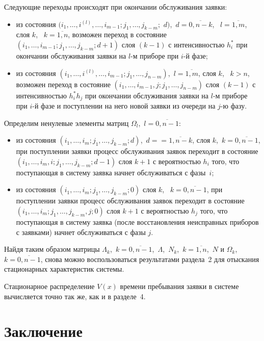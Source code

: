\begin{multicols}{2}
Следующие переходы происходят при окончании обслуживания заявки:
\begin{itemize}
\item
из состояния
$(i_1,\ldots,i^{(l)},\ldots,i_{m-1};j_1,\ldots,j_{k-m};$ $d)$,\
$d=\overline{0,n-k}$, \
$l=\overline{1,m}$,
слоя $k$, \ $k=\overline{1,n}$, возможен переход в состояние
$(i_1,\ldots,i_{m-1};j_1,\ldots,j_{k-m};d+1)$
слоя $(k-1)$ с интенсивностью $h^*_i $ при окончании обслуживания
заявки на $l$-м приборе при $i$-й фазе;
\item
из состояния
$(i_1,\ldots,i^{(l)}\!,\ldots,i_{m-1};j_1,\ldots,j_{n-m})$,\
$l=\overline{1,m}$,
слоя $k$, \ $k>n$, возможен переход в состояние
$(i_1,\ldots,i_{m-1},j;j_1,\ldots,j_{n-m})$
слоя $(k-1)$ с интенсивностью $h^*_i h_j$ при окончании обслуживания
заявки на $l$-м приборе при $i$-й фазе и поступлении на него
новой заявки из очереди на $j$-ю фазу.
\end{itemize}

Определим ненулевые элементы матриц
$\Omega_l$,\  $l=\overline{0,n-1}$:
\begin{itemize}
\item
из состояния
$(i_1,\ldots,i_{m};j_1,\ldots,j_{k-m};d)$,\ $d=$\linebreak $=\overline{1,n-k}$,
слоя $k$,\ $k=\overline{0,n-1}$,
при поступлении заявки процесс обслуживания заявок переходит в состояние
$(i_1,\ldots,i_{m},i;j_1,\ldots,j_{k-m};d-1)$ слоя $k+1$
с вероятностью $h_i$ того, что поступающая в систему заявка начнет
обслуживаться с фазы~$i$;
\item
из состояния
$(i_1,\ldots,i_{m};j_1,\ldots,j_{k-m};0)$
слоя $k$, \ $k=\overline{0,n-1}$,
при поступлении заявки процесс обслуживания заявок переходит в состояние
$(i_1,\ldots,i_{m};j_1,\ldots,j_{k-m},j;0)$ слоя $k+1$
с вероятностью $h_j$ того, что поступающая в систему заявка (после
восстановления неисправных приборов с заявками) начнет обслуживаться
с фазы $j$.
\end{itemize}

Найдя таким образом матрицы $\Lambda_k$,\  $k=\overline{0,n-1}$,\
$\Lambda$,\  $N_k$,\  $k=\overline{1,n}$,\  $N$ и
$\Omega_k$, \ $k=\overline{0,n-1}$, снова
можно воспользоваться результатами раздела~2 для отыскания стационарных
характеристик системы.

Стационарное распределение $V(x)$ времени пребывания заявки в системе
вычисляется точно так же, как и в разделе~4.

\section{Заключение}


\end{multicols}
